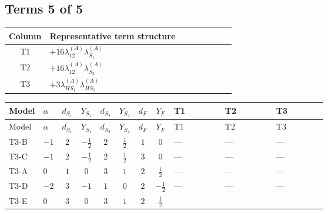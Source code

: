 \documentclass[8pt]{article}
\begin{document}
\begin{landscape}
\subsection*{Terms 5 of 5}
\begin{center}
\begin{tabular}{@{}c >{\raggedright\arraybackslash}p{0.82\linewidth}@{}}
\toprule
Column & Representative term structure \\
\midrule
T1 & \(\displaystyle +16 {\lambda_{12}^{(A)}} {\lambda_{S_1}^{(A)}}\) \\
\midrule
T2 & \(\displaystyle +16 {\lambda_{12}^{(A)}} {\lambda_{S_2}^{(A)}}\) \\
\midrule
T3 & \(\displaystyle +3 {\lambda_{HS_1}^{(A)}} {\lambda_{HS_2}^{(A)}}\) \\
\midrule
\bottomrule
\end{tabular}
\end{center}
\smallskip
\tiny
\begin{longtable}{@{}llcccccc >{\raggedright\arraybackslash}p{0.21\linewidth} >{\raggedright\arraybackslash}p{0.21\linewidth} >{\raggedright\arraybackslash}p{0.21\linewidth}@{}}
\toprule
Model & $\alpha$ & $d_{S_1}$ & $Y_{S_1}$ & $d_{S_2}$ & $Y_{S_2}$ & $d_F$ & $Y_F$ & T1 & T2 & T3 \\
\midrule
\endfirsthead
\toprule
Model & $\alpha$ & $d_{S_1}$ & $Y_{S_1}$ & $d_{S_2}$ & $Y_{S_2}$ & $d_F$ & $Y_F$ & T1 & T2 & T3 \\
\midrule
\endhead
T3-B & $-1$ & $2$ & $-\frac{1}{2}$ & $2$ & $\frac{1}{2}$ & $1$ & $0$ & --- & --- & --- \\
\midrule
T3-C & $-1$ & $2$ & $-\frac{1}{2}$ & $2$ & $\frac{1}{2}$ & $3$ & $0$ & --- & --- & --- \\
\midrule
T3-A & $0$ & $1$ & $0$ & $3$ & $1$ & $2$ & $\frac{1}{2}$ & --- & --- & --- \\
\midrule
T3-D & $-2$ & $3$ & $-1$ & $1$ & $0$ & $2$ & $-\frac{1}{2}$ & --- & --- & --- \\
\midrule
T3-E & $0$ & $3$ & $0$ & $3$ & $1$ & $2$ & $\frac{1}{2}$ & \scriptsize\adjustbox{max width=\linewidth}{$\begin{gathered} +16 {\lambda_{12}^{(A)}} {\lambda_{S_1}^{(A)}}\end{gathered}$} & \scriptsize\adjustbox{max width=\linewidth}{$\begin{gathered} +16 {\lambda_{12}^{(A)}} {\lambda_{S_2}^{(A)}}\end{gathered}$} & \scriptsize\adjustbox{max width=\linewidth}{$\begin{gathered} +3 {\lambda_{HS_1}^{(A)}} {\lambda_{HS_2}^{(A)}}\end{gathered}$} \\
\midrule
\bottomrule
\end{longtable}
\clearpage

\end{landscape}
\end{document}
